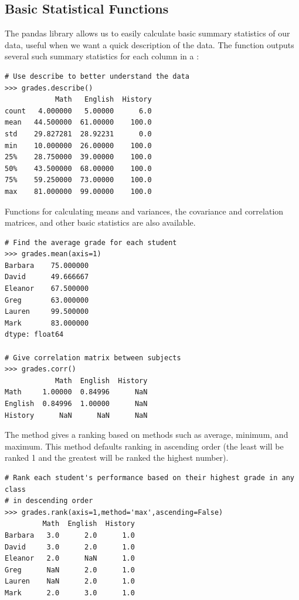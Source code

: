 
\subsection*{Basic Statistical Functions}

The pandas library allows us to easily calculate basic summary statistics of our data,
useful when we want a quick description of the data.
The  function
outputs several such summary statistics for each column in a :
\begin{lstlisting}
# Use describe to better understand the data
>>> grades.describe()
            Math   English  History
count   4.000000   5.00000      6.0
mean   44.500000  61.00000    100.0
std    29.827281  28.92231      0.0
min    10.000000  26.00000    100.0
25%    28.750000  39.00000    100.0
50%    43.500000  68.00000    100.0
75%    59.250000  73.00000    100.0
max    81.000000  99.00000    100.0
\end{lstlisting}

Functions for calculating means and variances, the covariance and correlation matrices, and other
basic statistics are also available.

\begin{lstlisting}
# Find the average grade for each student
>>> grades.mean(axis=1)
Barbara    75.000000
David      49.666667
Eleanor    67.500000
Greg       63.000000
Lauren     99.500000
Mark       83.000000
dtype: float64

# Give correlation matrix between subjects
>>> grades.corr()
            Math  English  History
Math     1.00000  0.84996      NaN
English  0.84996  1.00000      NaN
History      NaN      NaN      NaN
\end{lstlisting}

The method  gives a ranking based on methods such as average, minimum, and maximum.
This method defaults ranking in ascending order (the least will be ranked 1 and the greatest will be ranked the highest number).

\begin{lstlisting}
# Rank each student's performance based on their highest grade in any class
# in descending order
>>> grades.rank(axis=1,method='max',ascending=False)
         Math  English  History
Barbara   3.0      2.0      1.0
David     3.0      2.0      1.0
Eleanor   2.0      NaN      1.0
Greg      NaN      2.0      1.0
Lauren    NaN      2.0      1.0
Mark      2.0      3.0      1.0
\end{lstlisting}

